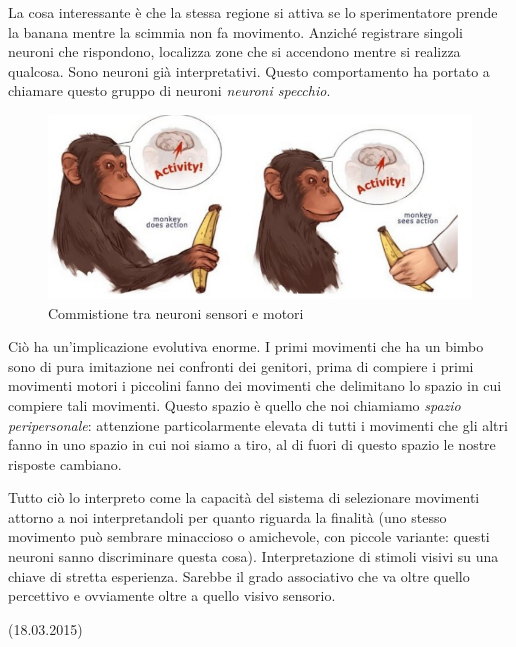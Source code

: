 \documentclass[a4paper,12pt]{article}
\begin{document}
La cosa interessante è che la stessa regione si attiva se lo sperimentatore prende la banana mentre la scimmia non fa movimento. Anziché registrare singoli neuroni che rispondono, localizza zone che si accendono mentre si realizza qualcosa. Sono neuroni già interpretativi. Questo comportamento ha portato a chiamare questo gruppo di neuroni \emph{neuroni specchio}.


\begin{figure}[H]
\centering
\includegraphics[scale=0.5]{immagine/scimmia.jpg}
\caption{Commistione tra neuroni sensori e motori}
\end{figure}

Ciò ha un'implicazione evolutiva enorme. I primi movimenti che ha un bimbo sono di pura imitazione nei confronti dei genitori, prima di compiere i primi movimenti motori i piccolini fanno dei movimenti che delimitano lo spazio in cui compiere tali movimenti. Questo spazio è quello che noi chiamiamo \emph{spazio peripersonale}: attenzione particolarmente elevata di tutti i movimenti che gli altri fanno in uno spazio in cui noi siamo a tiro, al di fuori di questo spazio le nostre risposte cambiano. 

Tutto ciò lo interpreto come la capacità del sistema di selezionare movimenti attorno a noi interpretandoli per quanto riguarda la finalità (uno stesso movimento può sembrare minaccioso o amichevole, con piccole variante: questi neuroni sanno discriminare questa cosa). Interpretazione di stimoli visivi su una chiave di stretta esperienza. Sarebbe il grado associativo che va oltre quello percettivo e ovviamente oltre a quello visivo sensorio.   

(18.03.2015)
\end{document}

